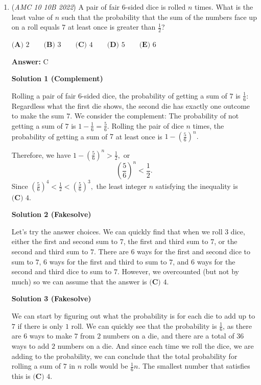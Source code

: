 \begin{enumerate}
 


	\item (\textit{AMC 10 10B 2022}) A pair of fair $6$-sided dice is rolled $n$ times. What is the least value of $n$ such that the probability that the sum of the numbers face up on a roll equals $7$ at least once is greater than $\frac{1}{2}$?


 $\textbf{(A) } 2 \qquad \textbf{(B) } 3 \qquad \textbf{(C) } 4 \qquad \textbf{(D) } 5 \qquad \textbf{(E) } 6$

 \textbf{Answer: }C



\textbf{Solution 1 (Complement)}

Rolling a pair of fair $6$-sided dice, the probability of getting a sum of $7$ is $\frac16:$ Regardless what the first die shows, the second die has exactly one outcome to make the sum $7.$ We consider the complement: The probability of not getting a sum of $7$ is $1-\frac16=\frac56.$ Rolling the pair of dice $n$ times, the probability of getting a sum of $7$ at least once is $1-\left(\frac56\right)^n.$

 Therefore, we have $1-\left(\frac56\right)^n>\frac12,$ or 
 \[\left(\frac56\right)^n<\frac12.\] Since $\left(\frac56\right)^4<\frac12<\left(\frac56\right)^3,$ the least integer $n$ satisfying the inequality is $\boxed{\textbf{(C) } 4}.$




\textbf{Solution 2 (Fakesolve)}

Let's try the answer choices. We can quickly find that when we roll $3$ dice, either the first and second sum to $7$, the first and third sum to $7$, or the second and third sum to $7$. There are $6$ ways for the first and second dice to sum to $7$,  $6$ ways for the first and third to sum to $7$, and $6$ ways for the second and third dice to sum to $7$. However, we overcounted (but not by much) so we can assume that the answer is $\boxed {\textbf{(C) }4}$.

 



\textbf{Solution 3 (Fakesolve)}

We can start by figuring out what the probability is for each die to add up to $7$ if there is only $1$ roll. We can quickly see that the probability is $\frac16$, as there are $6$ ways to make $7$ from $2$ numbers on a die, and there are a total of $36$ ways to add $2$ numbers on a die. And since each time we roll the dice, we are adding to the probability, we can conclude that the total probability for rolling a sum of $7$ in $n$ rolls would be $\frac16$$n$. The smallest number that satisfies this is $\boxed {\textbf{(C) }4}$.


\end{enumerate}
